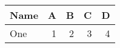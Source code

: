 %
%
%
%
%
\begin{tabular}{lrrrr}
  \toprule
  Name & A & B & C & D \\
  \midrule
  One & 1 & 2 & 3 & 4 \\
  \bottomrule
\end{tabular}
